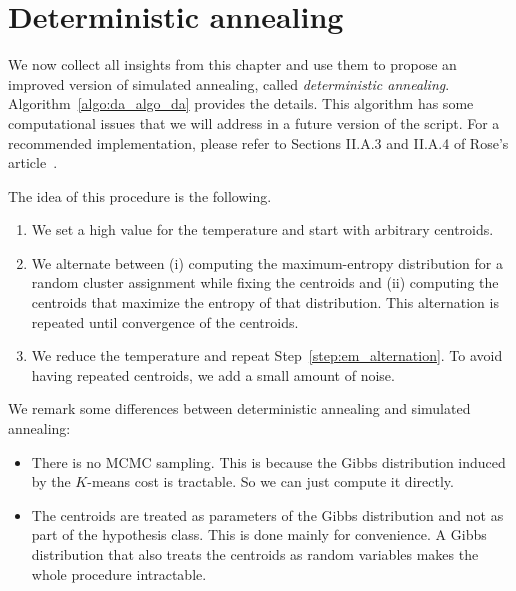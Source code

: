 \section{Deterministic annealing}
\label{sec:algo_da}

We now collect all insights from this chapter and use them to propose
an improved version of simulated annealing, called \emph{deterministic annealing}.
Algorithm~\ref{algo:da_algo_da} provides the details. This algorithm has some computational issues that we will address in a future version of the script. For a recommended implementation, please refer to Sections II.A.3 and II.A.4 of Rose's article~\cite{rose1998deterministic}. 

The idea of this procedure is the
following.

\begin{enumerate}
\item We set a high value for the temperature and start with arbitrary
centroids.
\item \label{step:em_alternation} We alternate between (i) computing the maximum-entropy distribution
for a random cluster assignment while fixing the centroids
and (ii) computing the centroids that maximize the entropy of that
distribution. This alternation is repeated until convergence of the
centroids.
\item We reduce the temperature and repeat Step~\ref{step:em_alternation}. To avoid having repeated
centroids, we add a small amount of noise.
\end{enumerate}

We remark some differences between deterministic annealing and simulated
annealing:

\begin{itemize}
\item There is no MCMC sampling. This is because the Gibbs distribution
induced by the $K$-means cost is tractable. So we can just compute it
directly.
\item The centroids are treated as parameters of the Gibbs distribution
and not as part of the hypothesis class. This is done mainly for
convenience. A Gibbs distribution that also treats the centroids as
random variables makes the whole procedure intractable.
\end{itemize}

